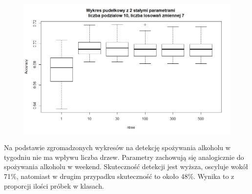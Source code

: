 \begin{figure}[h]
     \centering 
     \includegraphics[scale=0.60]{tex/boxplot_dalc_ntree.png}
     \label{fig:classes}
\end{figure}

Na podstawie zgromadzonych wykresów na detekcję spożywania alkoholu w tygodniu nie ma wpływu liczba drzew. Parametry zachowują się analogicznie do spożywania alkoholu w weekend. Skuteczność detekcji jest wyższa, oscyluje wokół 71\%, natomiast w drugim przypadku skuteczność to około 48\%. Wynika to z proporcji ilości próbek w klasach. 
